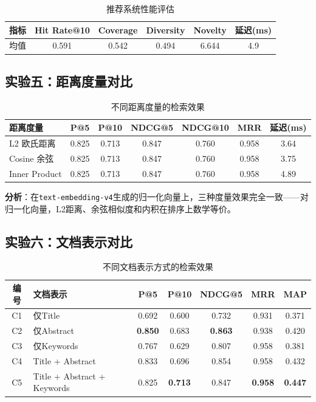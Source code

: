 \documentclass[12pt,a4paper]{ctexart}
\newcommand{\code}[1]{\texttt{#1}}
\begin{document}
\begin{table}[H]
\centering
\caption{推荐系统性能评估}
\begin{tabular}{lccccc}
\toprule
\textbf{指标} & \textbf{Hit Rate@10} & \textbf{Coverage} & \textbf{Diversity} & \textbf{Novelty} & \textbf{延迟(ms)} \\
\midrule
均值 & 0.591 & 0.542 & 0.494 & 6.644 & 4.9 \\
\bottomrule
\end{tabular}
\end{table}

\subsection{实验五：距离度量对比}

\begin{table}[H]
\centering
\caption{不同距离度量的检索效果}
\begin{tabular}{lcccccc}
\toprule
\textbf{距离度量} & \textbf{P@5} & \textbf{P@10} & \textbf{NDCG@5} & \textbf{NDCG@10} & \textbf{MRR} & \textbf{延迟(ms)} \\
\midrule
L2 欧氏距离    & 0.825 & 0.713 & 0.847 & 0.760 & 0.958 & 3.64 \\
Cosine 余弦    & 0.825 & 0.713 & 0.847 & 0.760 & 0.958 & 3.75 \\
Inner Product  & 0.825 & 0.713 & 0.847 & 0.760 & 0.958 & 4.89 \\
\bottomrule
\end{tabular}
\end{table}

\textbf{分析}：在\code{text-embedding-v4}生成的归一化向量上，三种度量效果完全一致——对归一化向量，L2距离、余弦相似度和内积在排序上数学等价。

\subsection{实验六：文档表示对比}

\begin{table}[H]
\centering
\caption{不同文档表示方式的检索效果}
\label{tab:doc_repr}
\begin{tabular}{clccccc}
\toprule
\textbf{编号} & \textbf{文档表示} & \textbf{P@5} & \textbf{P@10} & \textbf{NDCG@5} & \textbf{MRR} & \textbf{MAP} \\
\midrule
C1 & 仅Title                    & 0.692 & 0.600 & 0.732 & 0.931 & 0.371 \\
C2 & 仅Abstract                 & \textbf{0.850} & 0.683 & \textbf{0.863} & 0.938 & 0.420 \\
C3 & 仅Keywords                 & 0.767 & 0.629 & 0.807 & 0.958 & 0.381 \\
C4 & Title + Abstract           & 0.833 & 0.696 & 0.854 & 0.958 & 0.432 \\
C5 & Title + Abstract + Keywords& 0.825 & \textbf{0.713} & 0.847 & \textbf{0.958} & \textbf{0.447} \\
\bottomrule
\end{tabular}
\end{table}
\end{document}

